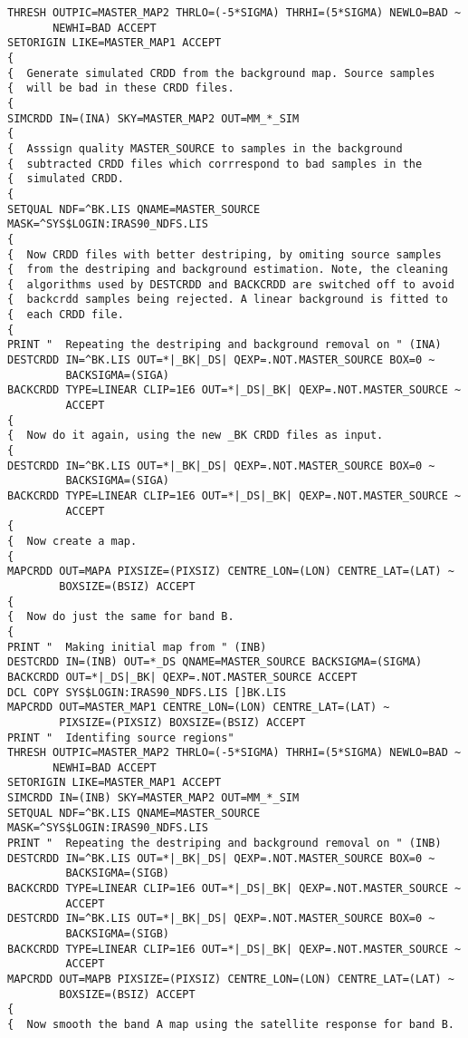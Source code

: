 \begin{verbatim}
THRESH OUTPIC=MASTER_MAP2 THRLO=(-5*SIGMA) THRHI=(5*SIGMA) NEWLO=BAD ~
       NEWHI=BAD ACCEPT
SETORIGIN LIKE=MASTER_MAP1 ACCEPT
{
{  Generate simulated CRDD from the background map. Source samples
{  will be bad in these CRDD files. 
{
SIMCRDD IN=(INA) SKY=MASTER_MAP2 OUT=MM_*_SIM
{
{  Asssign quality MASTER_SOURCE to samples in the background 
{  subtracted CRDD files which corrrespond to bad samples in the 
{  simulated CRDD. 
{
SETQUAL NDF=^BK.LIS QNAME=MASTER_SOURCE MASK=^SYS$LOGIN:IRAS90_NDFS.LIS
{
{  Now CRDD files with better destriping, by omiting source samples
{  from the destriping and background estimation. Note, the cleaning 
{  algorithms used by DESTCRDD and BACKCRDD are switched off to avoid
{  backcrdd samples being rejected. A linear background is fitted to
{  each CRDD file.
{
PRINT "  Repeating the destriping and background removal on " (INA)
DESTCRDD IN=^BK.LIS OUT=*|_BK|_DS| QEXP=.NOT.MASTER_SOURCE BOX=0 ~
         BACKSIGMA=(SIGA)
BACKCRDD TYPE=LINEAR CLIP=1E6 OUT=*|_DS|_BK| QEXP=.NOT.MASTER_SOURCE ~
         ACCEPT
{
{  Now do it again, using the new _BK CRDD files as input.
{
DESTCRDD IN=^BK.LIS OUT=*|_BK|_DS| QEXP=.NOT.MASTER_SOURCE BOX=0 ~
         BACKSIGMA=(SIGA)
BACKCRDD TYPE=LINEAR CLIP=1E6 OUT=*|_DS|_BK| QEXP=.NOT.MASTER_SOURCE ~
         ACCEPT
{
{  Now create a map.
{
MAPCRDD OUT=MAPA PIXSIZE=(PIXSIZ) CENTRE_LON=(LON) CENTRE_LAT=(LAT) ~
        BOXSIZE=(BSIZ) ACCEPT
{
{  Now do just the same for band B.
{
PRINT "  Making initial map from " (INB)
DESTCRDD IN=(INB) OUT=*_DS QNAME=MASTER_SOURCE BACKSIGMA=(SIGMA)
BACKCRDD OUT=*|_DS|_BK| QEXP=.NOT.MASTER_SOURCE ACCEPT
DCL COPY SYS$LOGIN:IRAS90_NDFS.LIS []BK.LIS
MAPCRDD OUT=MASTER_MAP1 CENTRE_LON=(LON) CENTRE_LAT=(LAT) ~
        PIXSIZE=(PIXSIZ) BOXSIZE=(BSIZ) ACCEPT
PRINT "  Identifing source regions"
THRESH OUTPIC=MASTER_MAP2 THRLO=(-5*SIGMA) THRHI=(5*SIGMA) NEWLO=BAD ~
       NEWHI=BAD ACCEPT
SETORIGIN LIKE=MASTER_MAP1 ACCEPT
SIMCRDD IN=(INB) SKY=MASTER_MAP2 OUT=MM_*_SIM
SETQUAL NDF=^BK.LIS QNAME=MASTER_SOURCE MASK=^SYS$LOGIN:IRAS90_NDFS.LIS
PRINT "  Repeating the destriping and background removal on " (INB)
DESTCRDD IN=^BK.LIS OUT=*|_BK|_DS| QEXP=.NOT.MASTER_SOURCE BOX=0 ~
         BACKSIGMA=(SIGB)
BACKCRDD TYPE=LINEAR CLIP=1E6 OUT=*|_DS|_BK| QEXP=.NOT.MASTER_SOURCE ~
         ACCEPT
DESTCRDD IN=^BK.LIS OUT=*|_BK|_DS| QEXP=.NOT.MASTER_SOURCE BOX=0 ~
         BACKSIGMA=(SIGB)
BACKCRDD TYPE=LINEAR CLIP=1E6 OUT=*|_DS|_BK| QEXP=.NOT.MASTER_SOURCE ~
         ACCEPT
MAPCRDD OUT=MAPB PIXSIZE=(PIXSIZ) CENTRE_LON=(LON) CENTRE_LAT=(LAT) ~
        BOXSIZE=(BSIZ) ACCEPT
{
{  Now smooth the band A map using the satellite response for band B.

\end{verbatim}
